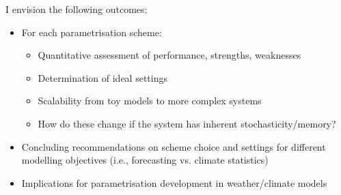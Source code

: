 \documentclass[12pt, aspectratio=169]{beamer}
\begin{document}
\begin{frame}{I envision the following outcomes:}
\begin{itemize}
    \item<1> For each parametrisation scheme:
    \begin{itemize}
        \item Quantitative assessment of performance, strengths, weaknesses
        \item Determination of ideal settings
        \item Scalability from toy models to more complex systems
        \item How do these change if the system has inherent
            stochasticity/memory?
    \end{itemize}
    \item<2> Concluding recommendations on scheme choice and settings for
        different modelling objectives (i.e., forecasting vs. climate
        statistics)
    \item<3> Implications for parametrisation development in weather/climate
        models
\end{itemize}
\end{frame}
\end{document}
